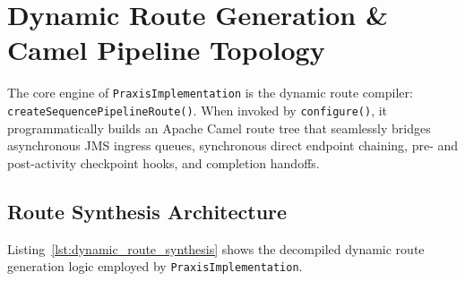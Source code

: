 \section{Dynamic Route Generation \& Camel Pipeline Topology}
\label{sec:praxis_dynamic_routing}

The core engine of \texttt{PraxisImplementation} is the dynamic route compiler: \texttt{createSequencePipelineRoute()}. When invoked by \texttt{configure()}, it programmatically builds an Apache Camel route tree that seamlessly bridges asynchronous JMS ingress queues, synchronous direct endpoint chaining, pre- and post-activity checkpoint hooks, and completion handoffs.

\subsection{Route Synthesis Architecture}
\label{subsec:routing_synthesis}

Listing~\ref{lst:dynamic_route_synthesis} shows the decompiled dynamic route generation logic employed by \texttt{PraxisImplementation}.

